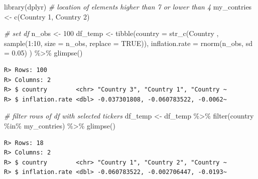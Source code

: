 \documentclass[
  12pt,
]{book}
\newenvironment{Shaded}{\begin{snugshade}}{\end{snugshade}}
\newcommand{\AttributeTok}[1]{\textcolor[rgb]{0.61,0.61,0.61}{#1}}
\newcommand{\CommentTok}[1]{\textcolor[rgb]{0.37,0.37,0.37}{\textit{#1}}}
\newcommand{\ConstantTok}[1]{\textcolor[rgb]{0,0,0}{#1}}
\newcommand{\DecValTok}[1]{\textcolor[rgb]{0.06,0.06,0.06}{#1}}
\newcommand{\FloatTok}[1]{\textcolor[rgb]{0.06,0.06,0.06}{#1}}
\newcommand{\FunctionTok}[1]{\textcolor[rgb]{0,0,0}{#1}}
\newcommand{\NormalTok}[1]{#1}
\newcommand{\OtherTok}[1]{\textcolor[rgb]{0.37,0.37,0.37}{#1}}
\newcommand{\SpecialCharTok}[1]{\textcolor[rgb]{0,0,0}{#1}}
\newcommand{\StringTok}[1]{\textcolor[rgb]{0.5,0.5,0.5}{#1}}
\begin{document}
\begin{Shaded}
\begin{Highlighting}[]
\FunctionTok{library}\NormalTok{(dplyr)}
\CommentTok{\# location of elements higher than 7 or lower than 4}
\NormalTok{my\_contries }\OtherTok{\textless{}{-}} \FunctionTok{c}\NormalTok{(}\StringTok{\textquotesingle{}Country 1\textquotesingle{}}\NormalTok{, }\StringTok{\textquotesingle{}Country 2\textquotesingle{}}\NormalTok{)}

\CommentTok{\# set df}
\NormalTok{n\_obs }\OtherTok{\textless{}{-}} \DecValTok{100}
\NormalTok{df\_temp }\OtherTok{\textless{}{-}} \FunctionTok{tibble}\NormalTok{(}\AttributeTok{country =} \FunctionTok{str\_c}\NormalTok{(}\StringTok{\textquotesingle{}Country \textquotesingle{}}\NormalTok{,}
                                  \FunctionTok{sample}\NormalTok{(}\DecValTok{1}\SpecialCharTok{:}\DecValTok{10}\NormalTok{, }
                                         \AttributeTok{size =}\NormalTok{ n\_obs,}
                                         \AttributeTok{replace =} \ConstantTok{TRUE}\NormalTok{)),}
                  \AttributeTok{inflation.rate =} \FunctionTok{rnorm}\NormalTok{(n\_obs, }\AttributeTok{sd =} \FloatTok{0.05}\NormalTok{) ) }\SpecialCharTok{\%\textgreater{}\%}
  \FunctionTok{glimpse}\NormalTok{()}
\end{Highlighting}
\end{Shaded}

\begin{verbatim}
R> Rows: 100
R> Columns: 2
R> $ country        <chr> "Country 3", "Country 1", "Country ~
R> $ inflation.rate <dbl> -0.037301808, -0.060783522, -0.0062~
\end{verbatim}

\begin{Shaded}
\begin{Highlighting}[]
\CommentTok{\# filter rows of df with selected tickers}
\NormalTok{df\_temp }\OtherTok{\textless{}{-}}\NormalTok{ df\_temp }\SpecialCharTok{\%\textgreater{}\%}
  \FunctionTok{filter}\NormalTok{(country }\SpecialCharTok{\%in\%}\NormalTok{ my\_contries) }\SpecialCharTok{\%\textgreater{}\%}
  \FunctionTok{glimpse}\NormalTok{()}
\end{Highlighting}
\end{Shaded}

\begin{verbatim}
R> Rows: 18
R> Columns: 2
R> $ country        <chr> "Country 1", "Country 2", "Country ~
R> $ inflation.rate <dbl> -0.060783522, -0.002706447, -0.0193~
\end{verbatim}
\end{document}

